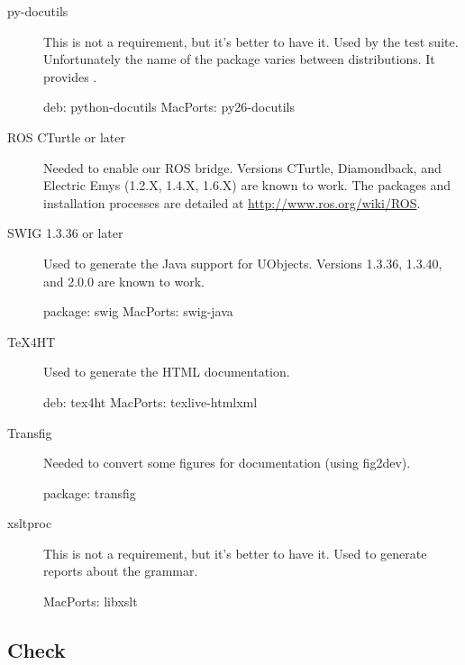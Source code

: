 \begin{description}
\item[py-docutils] This is not a requirement, but it's better to have
  it.  Used by the test suite.  Unfortunately the name of the package
  varies between distributions.  It provides .
\begin{package}
deb: python-docutils
MacPorts: py26-docutils
\end{package}

\item[ROS CTurtle or later] Needed to enable our ROS bridge.  Versions
  CTurtle, Diamondback, and Electric Emys (1.2.X, 1.4.X, 1.6.X) are known to
  work.  The packages and installation processes are detailed at
  \url{http://www.ros.org/wiki/ROS}.

\item[SWIG 1.3.36 or later] Used to generate the Java support for UObjects.
  Versions 1.3.36, 1.3.40, and 2.0.0 are known to work.
\begin{package}
package: swig
MacPorts: swig-java
\end{package}

\item[TeX4HT] Used to generate the HTML documentation.
\begin{package}
deb: tex4ht
MacPorts: texlive-htmlxml
\end{package}

\item[Transfig] Needed to convert some figures for documentation
  (using fig2dev).
\begin{package}
package: transfig
\end{package}

\item[xsltproc] This is not a requirement, but it's better to have it. Used
  to generate reports about the \us grammar.
\begin{package}
MacPorts: libxslt
\end{package}
\end{description}

\subsection{Check}
\label{sec:build:req:check}

